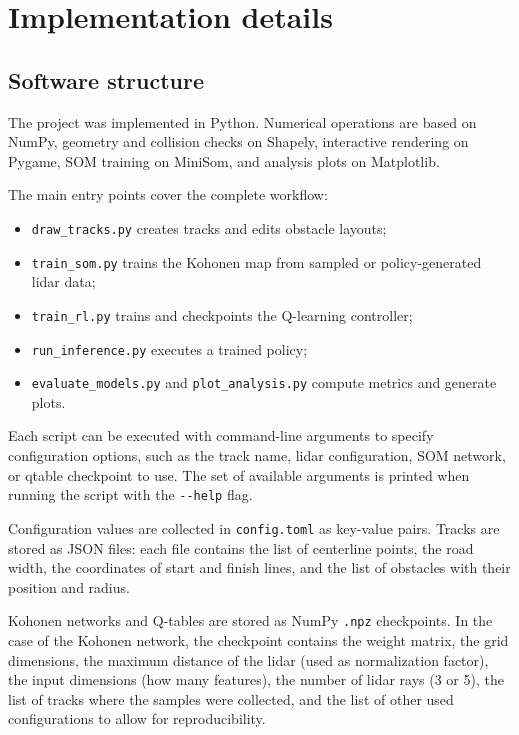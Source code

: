 \section{Implementation details}
\label{ch:implementation}

\subsection{Software structure}

The project was implemented in Python. Numerical operations are based on NumPy, geometry and collision checks on Shapely, interactive rendering on Pygame, SOM training on MiniSom, and analysis plots on Matplotlib.

The main entry points cover the complete workflow:
\begin{itemize}
    \item \texttt{draw\_tracks.py} creates tracks and edits obstacle layouts;
    \item \texttt{train\_som.py} trains the Kohonen map from sampled or policy-generated lidar data;
    \item \texttt{train\_rl.py} trains and checkpoints the Q-learning controller;
    \item \texttt{run\_inference.py} executes a trained policy;
    \item \texttt{evaluate\_models.py} and \texttt{plot\_analysis.py} compute metrics and generate plots.
\end{itemize}
Each script can be executed with command-line arguments to specify configuration options, such as the track name, lidar configuration, SOM network, or qtable checkpoint to use. The set of available arguments is printed when running the script with the \texttt{-{}-help} flag.

Configuration values are collected in \texttt{config.toml} as key-value pairs. Tracks are stored as JSON files: each file contains the list of centerline points, the road width, the coordinates of start and finish lines, and the list of obstacles with their position and radius.

Kohonen networks and Q-tables are stored as NumPy \texttt{.npz} checkpoints. In the case of the Kohonen network, the checkpoint contains the weight matrix, the grid dimensions, the maximum distance of the lidar (used as normalization factor), the input dimensions (how many features), the number of lidar rays (3 or 5), the list of tracks where the samples were collected, and the list of other used configurations to allow for reproducibility.

